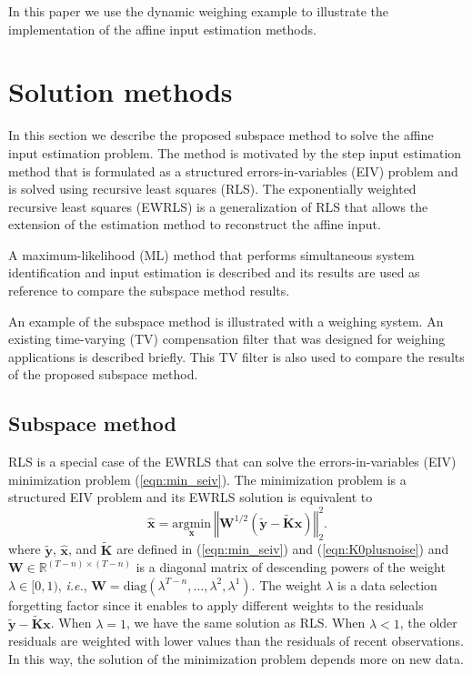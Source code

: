 In this paper we use the dynamic weighing example to illustrate the implementation of the affine input estimation methods.



\section{Solution methods}

In this section we describe the proposed subspace method to solve the affine input estimation problem.
The method is motivated by the step input estimation method that is formulated as a structured errors-in-variables (EIV) problem and is solved using recursive least squares (RLS).
The exponentially weighted recursive least squares (EWRLS) is a generalization of RLS that allows the extension of the estimation method to reconstruct the affine input.

A maximum-likelihood (ML) method that performs simultaneous system identification and input estimation is described and its results are used as reference to compare the subspace method results.

An example of the subspace method is illustrated with a weighing system.
An existing time-varying (TV) compensation filter that was designed for weighing applications is described briefly.
This TV filter is also used to compare the results of the proposed subspace method.


\subsection{Subspace method}

RLS is a special case of the EWRLS that can solve the errors-in-variables (EIV) minimization problem (\ref{eqn:min_seiv}).
The minimization problem is a structured EIV problem and its EWRLS solution is equivalent to 
\begin{equation} \widehat{\mathbf{x}} = \underset{\mathbf{x}}{\mathrm{argmin}} \ \left\Vert \mathbf{W}^{1/2} \left( \widetilde{\mathbf{y}} - \widetilde{\mathbf{K}} \mathbf{x} \right) \right\Vert^2_2 . \label{eqn:min_ewrls} \end{equation}
where $\widetilde{\mathbf{y}}$, $\widehat{\mathbf{x}}$, and $\widetilde{\mathbf{K}}$ are defined in (\ref{eqn:min_seiv}) and (\ref{eqn:K0plusnoise}) and
$\mathbf{W} \in \mathbb{R}^{(T-n) \times (T-n)}$ is a diagonal matrix of descending powers of the weight $\lambda \in [0, 1)$, \textit{i.e.}, $\mathbf{W} = \mathrm{diag}\left(\lambda^{T-n}, \ldots, \lambda^2, \lambda^1 \right)$.
The weight $\lambda$ is a data selection forgetting factor since it enables to apply different weights to the residuals $\widetilde{\mathbf{y}} - \widetilde{\mathbf{K}} \mathbf{x}$.
When $\lambda=1$, we have the same solution as RLS.
When $\lambda<1$, the older residuals are weighted with lower values than the residuals of recent observations.
In this way, the solution of the minimization problem depends more on new data. 

